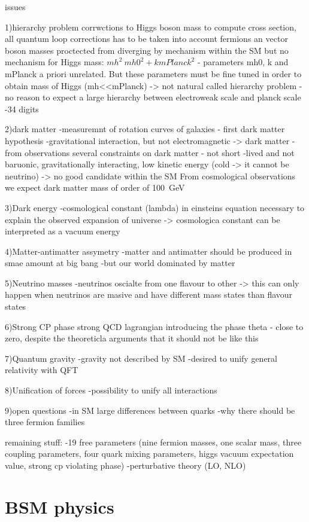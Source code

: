 issues

1)hierarchy problem
corrwctions to Higgs boson mass
to compute cross section, all quantum loop corrections has to be taken into account
fermions an vector boson masses proctected from diverging by mechanism within the SM
but no mechanism for Higgs mass: $mh^2~ mh0^2+k mPlanck^2 $ - parameters mh0, k and mPlanck a priori unrelated. But these parameters must be fine tuned in order to obtain mass of Higgs (mh<<mPlanck) -> not natural
called hierarchy problem - no reason to expect a large hierarchy between electroweak scale and planck scale
-34 digits

2)dark matter
-measuremnt of rotation curves of galaxies - first dark matter hypothesis
-gravitational interaction, but not electromagnetic -> dark matter
-from observations several constraints on dark matter - not short -lived and not baruonic, gravitationally interacting, low kinetic energy (cold -> it cannot be neutrino)
-> no good candidate within the SM
From cosmological observations we expect dark matter mass of order of 100~GeV

3)Dark energy
-cosmological constant (lambda) in einsteins equation necessary to explain the observed expansion of universe
-> cosmologica constant can be interpreted as a vacuum energy

4)Matter-antimatter assymetry
-matter and antimatter should be produced in smae amount at big bang
-but our world dominated by matter

5)Neutrino masses
-neutrinos oscialte from one flavour to other -> this can only happen when neutrinos are masive and have different mass states than flavour states

6)Strong CP phase
strong QCD lagrangian introducing the phase theta - close to zero, despite the theoreticla arguments that it should not be like this

7)Quantum gravity
-gravity not described by SM
-desired to unify general relativity with QFT

8)Unification of forces
-possibility to unify all interactions

9)open questions
-in SM large differences between quarks
-why there should be three fermion families

remaining stuff:
-19 free parameters (nine fermion masses, one scalar mass, three coupling parameters, four quark mixing parameters, higgs vacuum expectation value, strong cp violating phase)
-perturbative theory (LO, NLO)

\section{BSM physics}

